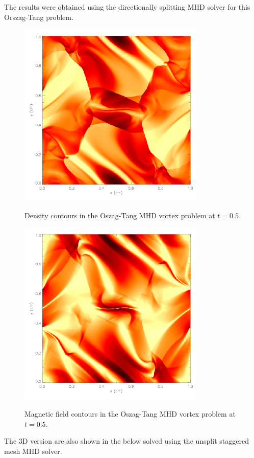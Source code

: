 The results were obtained using the directionally splitting
 MHD solver for this Orszag-Tang problem.

\begin{figure}[!ht]
\begin{center}
{\leavevmode\includegraphics[width=3.5in]{OrszagTang_dens}}
\end{center}
\caption{\label{Fig:orszag_tang_density} Density contours in the
Oszag-Tang MHD vortex problem at $t=0.5$. }
\end{figure}

\begin{figure}[!ht]
\begin{center}
{\leavevmode\includegraphics[width=3.5in]{OrszagTang_magf}}
\end{center}
\caption{\label{Fig:orszag_tang_magfield} Magnetic field contours
in the Oszag-Tang MHD vortex problem at $t=0.5$. }
\end{figure}
The 3D version are also shown in the below solved using the unsplit staggered mesh MHD solver. 

